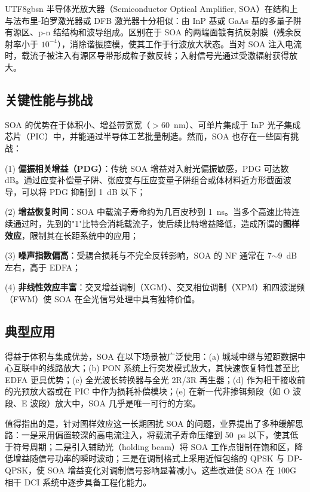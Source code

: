 \documentclass[11pt,a4paper]{article}
\begin{document}
\begin{CJK}{UTF8}{gbsn}
半导体光放大器（Semiconductor Optical Amplifier, SOA）在结构上与法布里-珀罗激光器或 DFB 激光器十分相似：由 InP 基或 GaAs 基的多量子阱有源区、p-n 结结构和波导组成。区别在于 SOA 的两端面镀有抗反射膜（残余反射率小于 $10^{-4}$），消除谐振腔模，使其工作于行波放大状态。当对 SOA 注入电流时，载流子被注入有源区导带形成粒子数反转；入射信号光通过受激辐射获得放大。

\subsection{关键性能与挑战}

SOA 的优势在于体积小、增益带宽宽（$>60$~nm）、可单片集成于 InP 光子集成芯片（PIC）中，并能通过半导体工艺批量制造。然而，SOA 也存在一些固有挑战\cite{connelly2002}：

(1) \textbf{偏振相关增益（PDG）}：传统 SOA 增益对入射光偏振敏感，PDG 可达数 dB。通过应变补偿量子阱、张应变与压应变量子阱组合或体材料近方形截面波导，可以将 PDG 抑制到 1~dB 以下；

(2) \textbf{增益恢复时间}：SOA 中载流子寿命约为几百皮秒到 1~ns。当多个高速比特连续通过时，先到的"1"比特会消耗载流子，使后续比特增益降低，造成所谓的\textbf{图样效应}，限制其在长距系统中的应用；

(3) \textbf{噪声指数偏高}：受耦合损耗与不完全反转影响，SOA 的 NF 通常在 7$\sim$9~dB 左右，高于 EDFA；

(4) \textbf{非线性效应丰富}：交叉增益调制（XGM）、交叉相位调制（XPM）和四波混频（FWM）使 SOA 在全光信号处理中具有独特价值。

\subsection{典型应用}

得益于体积与集成优势，SOA 在以下场景被广泛使用：(a) 城域中继与短距数据中心互联中的线路放大；(b) PON 系统上行突发模式放大，其快速恢复特性甚至比 EDFA 更具优势；(c) 全光波长转换器与全光 2R/3R 再生器；(d) 作为相干接收前的光预放大器或在 PIC 中作为损耗补偿模块\cite{connelly2002}；(e) 在新一代非掺铒频段（如 O 波段、E 波段）放大中，SOA 几乎是唯一可行的方案。

值得指出的是，针对图样效应这一长期困扰 SOA 的问题，业界提出了多种缓解思路：一是采用偏置较深的高电流注入，将载流子寿命压缩到 50~ps 以下，使其低于符号周期；二是引入辅助光（holding beam）将 SOA 工作点钳制在饱和区，降低增益随信号功率的瞬时波动；三是在调制格式上采用近恒包络的 QPSK 与 DP-QPSK，使 SOA 增益变化对调制信号影响显著减小。这些改进使 SOA 在 100G 相干 DCI 系统中逐步具备工程化能力。


\end{CJK}
\end{document}
